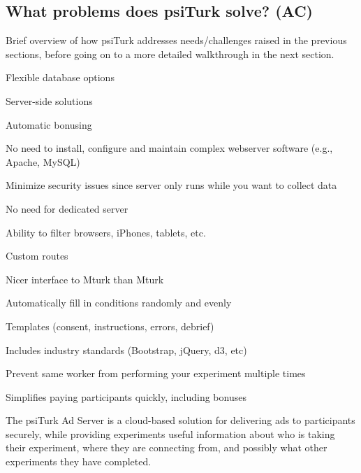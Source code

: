 \documentclass[jou,apacite]{apa6}
\begin{document}
\subsection{What problems does psiTurk solve? (AC)}

Brief overview of how psiTurk addresses needs/challenges raised in the previous sections, before going on to a more detailed walkthrough in the next section.

Flexible database options

Server-side solutions

Automatic bonusing

No need to install, configure and maintain complex webserver software (e.g., Apache, MySQL)

Minimize security issues since server only runs while you want to collect data

No need for dedicated server

Ability to filter browsers, iPhones, tablets, etc. 

Custom routes

Nicer interface to Mturk than Mturk 

Automatically fill in conditions randomly and evenly

Templates (consent, instructions, errors, debrief)

Includes industry standards (Bootstrap, jQuery, d3, etc) 

Prevent same worker from performing your experiment multiple times

Simplifies paying participants quickly, including bonuses

The psiTurk Ad Server is a cloud-based solution for delivering ads to participants securely, while providing experiments useful information about who is taking their experiment, where they are connecting from, and possibly what other experiments they have completed.


\end{document}
